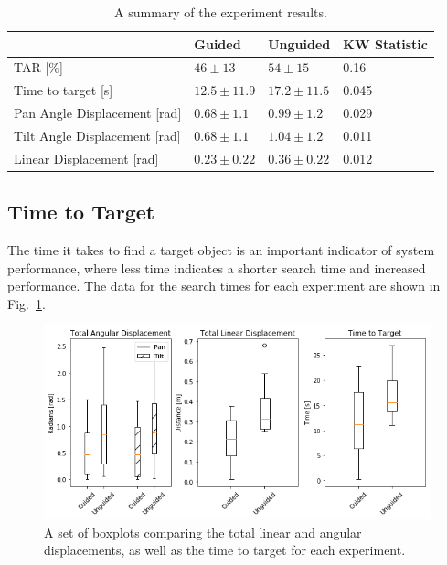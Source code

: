\documentclass[runningheads]{llncs}
\begin{document}
\begin{table}
  \centering
  \caption{A summary of the experiment results. }\label{tab:results}
  \begin{tabular}{p{5cm}p{2cm}p{2cm}p{2.5cm}}
    \toprule
    & \textbf{Guided}             & \textbf{Unguided} & \textbf{KW Statistic} \\\midrule
    TAR [\%]                      & $46\pm13$         & $54\pm15$     &  0.16 \\\midrule
    Time to target [s]            & $12.5\pm11.9$     & $17.2\pm11.5$ & 0.045 \\\midrule
    Pan Angle Displacement [rad]  & $0.68\pm1.1$      & $0.99\pm1.2$  & 0.029 \\\midrule
    Tilt Angle Displacement [rad] & $0.68\pm1.1$      & $1.04\pm1.2$  & 0.011 \\\midrule
    Linear Displacement [rad]     & $0.23\pm0.22$     & $0.36\pm0.22$ & 0.012 \\\midrule
    \bottomrule
  \end{tabular}
\end{table}

\subsection{Time to Target}

The time it takes to find a target object is an important indicator of system performance, where less time indicates a shorter search time and increased performance.
The data for the search times for each experiment are shown in Fig.~\ref{fig:boxplot-time}.

\begin{figure}[t]
  \centering
  \includegraphics[width=1.0\textwidth]{figures/boxplot_combined.png}
  \caption{A set of boxplots comparing the total linear and angular displacements, as well as the time to target for each experiment. }\label{fig:boxplot-time}
\end{figure}
\end{document}
